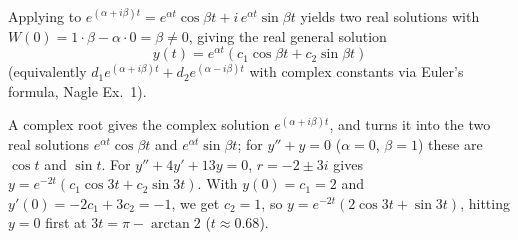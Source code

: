 \documentclass[10pt]{scrartcl}
\begin{document}
Applying  to $e^{(\alpha+i\beta)t}=e^{\alpha t}\cos\beta t+i\,e^{\alpha t}\sin\beta t$ yields two real solutions with $W(0)=1\cdot\beta-\alpha\cdot 0=\beta\neq 0$, giving the real general solution
\[
  y(t) = e^{\alpha t}(c_1\cos\beta t+c_2\sin\beta t)
\]
(equivalently $d_1e^{(\alpha+i\beta)t}+d_2e^{(\alpha-i\beta)t}$ with complex constants via Euler's formula, Nagle Ex.~1).

\revisit A complex root gives the complex solution $e^{(\alpha+i\beta)t}$, and  turns it into the two real solutions $e^{\alpha t}\cos\beta t$ and $e^{\alpha t}\sin\beta t$; for $y''+y=0$ ($\alpha=0$, $\beta=1$) these are $\cos t$ and $\sin t$. For $y''+4y'+13y=0$, $r=-2\pm 3i$ gives $y=e^{-2t}(c_1\cos 3t+c_2\sin 3t)$. With $y(0)=c_1=2$ and $y'(0)=-2c_1+3c_2=-1$, we get $c_2=1$, so $y=e^{-2t}(2\cos 3t+\sin 3t)$, hitting $y=0$ first at $3t=\pi-\arctan 2$ ($t\approx 0.68$).
\end{document}
